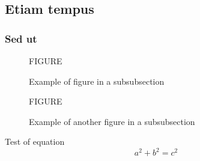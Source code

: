 \subsection{Etiam tempus}

\lipsum[1-2]

\subsubsection{Sed ut}

\lipsum[1-2]

\begin{figure}[hbtp]
  \centering FIGURE
  \caption{Example of figure in a subsubsection}
  \label{fig:F}
\end{figure}

\begin{figure}[hbtp]
  \centering FIGURE
  \caption{Example of another figure in a subsubsection}
  \label{fig:G}
\end{figure}

Test of equation
\begin{equation}
  \label{eq:A}
  a^2 + b^2 = c^2
\end{equation}
